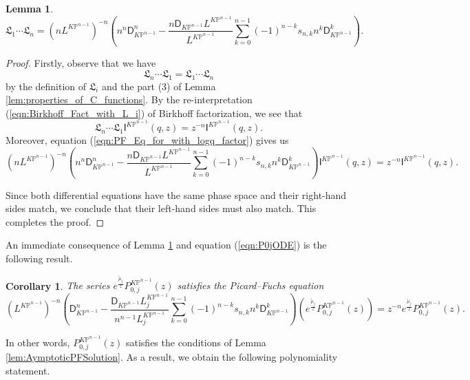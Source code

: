 \documentclass[12pt]{amsart}
\newtheorem{lem}[prop]{Lemma}
\newtheorem{cor}[prop]{Corollary}
\numberwithin{equation}{section}
\newcommand{\KP}{K\mathbb{P}}
\begin{document}
\begin{lem}\label{lem:PF_Factorization}
\begin{equation*}
\mathfrak{L}_1\cdots\mathfrak{L}_n=(nL^{\KP^{n-1}})^{-n}\left(n^n\mathsf{D}_{\KP^{n-1}}^n-\frac{n\mathsf{D}_{\KP^{n-1}}L^{\KP^{n-1}}}{L^{\KP^{n-1}}}\sum_{k=0}^{n-1}(-1)^{n-k}{s}_{n,k}n^k\mathsf{D}_{\KP^{n-1}}^k\right).
\end{equation*}
\end{lem}
\begin{proof}
Firstly, observe that we have
\begin{equation*}
\mathfrak{L}_n\cdots\mathfrak{L}_1=\mathfrak{L}_1\cdots\mathfrak{L}_n
\end{equation*}
by the definition of $\mathfrak{L}_i$ and the part (3) of Lemma \ref{lem:properties_of_C_functions}.
By the re-interpretation (\ref{eqn:Birkhoff_Fact_with_L_i}) of Birkhoff factorization, we see that
\begin{equation*}
\mathfrak{L}_n\cdots\mathfrak{L}_1\mathsf{I}^{\KP^{n-1}}(q,z)=z^{-n}\mathsf{I}^{\KP^{n-1}}(q,z). 
\end{equation*}
Moreover, equation (\ref{eqn:PF_Eq_for_with_logq_factor}) gives us
\begin{equation*}
(nL^{\KP^{n-1}})^{-n}\left(n^n\mathsf{D}_{\KP^{n-1}}^n-\frac{n\mathsf{D}_{\KP^{n-1}}L^{\KP^{n-1}}}{L^{\KP^{n-1}}}\sum_{k=0}^{n-1}(-1)^{n-k}{s}_{n,k}n^k\mathsf{D}_{\KP^{n-1}}^k\right)\mathsf{I}^{\KP^{n-1}}(q,z)=z^{-n}\mathsf{I}^{\KP^{n-1}}(q,z).
\end{equation*}

Since both differential equations have the same phase space and their right-hand sides match, we conclude that their left-hand sides must also match. This completes the proof.
\end{proof}

An immediate consequence of Lemma \ref{lem:PF_Factorization} and equation (\ref{eqn:P0jODE}) is the following result.
\begin{cor}\label{cor:PF_for_P0jz}
The series $e^{\frac{\widetilde{\mu}_{j}}{z}}P_{0,j}^{\KP^{n-1}}(z)$ satisfies the Picard--Fuchs equation 
\begin{equation*}
(L^{\KP^{n-1}})^{-n}\left(\mathsf{D}_{\KP^{n-1}}^n-\frac{{\mathsf{D}}_{\KP^{n-1}}L_j^{\KP^{n-1}}}{n^{n-1}L_j^{\KP^{n-1}}}\sum_{k=0}^{n-1}(-1)^{n-k}{s}_{n,k}n^k\mathsf{D}_{\KP^{n-1}}^k\right)\left(e^{\frac{\widetilde{\mu}_{j}}{z}}P_{0,j}^{\KP^{n-1}}(z)\right)=z^{-n}e^{\frac{\widetilde{\mu}_{j}}{z}}P_{0,j}^{\KP^{n-1}}(z).
\end{equation*}
\end{cor}
In other words, $P_{0,j}^{\KP^{n-1}}(z)$ satisfies the conditions of Lemma \ref{lem:AymptoticPFSolution}. As a result, we obtain the following polynomiality statement.
\end{document}
